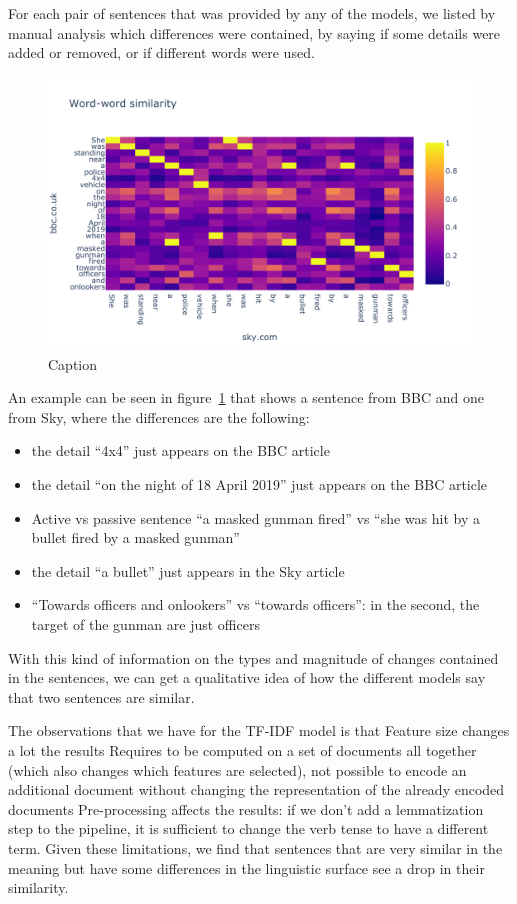 For each pair of sentences that was provided by any of the models, we listed by manual analysis which differences were contained, by saying if some details were added or removed, or if different words were used.


\begin{figure}[!htb]
    \centering
    \includegraphics[width=\linewidth]{figures/lyra.pdf}
    \caption{Caption}
    \label{fig:lyra}
\end{figure}

An example can be seen in figure~\ref{fig:lyra} that shows a sentence from BBC and one from Sky, where the differences are the following:

\begin{itemize}
    \item the detail ``4x4'' just appears on the BBC article
    \item the detail ``on the night of 18 April 2019'' just appears on the BBC article
    \item Active vs passive sentence ``a masked gunman fired'' vs ``she was hit by a bullet fired by a masked gunman''
    \item the detail ``a bullet'' just appears in the Sky article
    \item ``Towards officers and onlookers'' vs ``towards officers'': in the second, the target of the gunman are just officers
\end{itemize}

With this kind of information on the types and magnitude of changes contained in the sentences, we can get a qualitative idea of how the different models say that two sentences are similar.


The observations that we have for the TF-IDF model is that
Feature size changes a lot the results
Requires to be computed on a set of documents all together (which also changes which features are selected), not possible to encode an additional document without changing the representation of the already encoded documents
Pre-processing affects the results: if we don’t add a lemmatization step to the pipeline, it is sufficient to change the verb tense to have a different term.
Given these limitations, we find that sentences that are very similar in the meaning but have some differences in the linguistic surface see a drop in their similarity.

